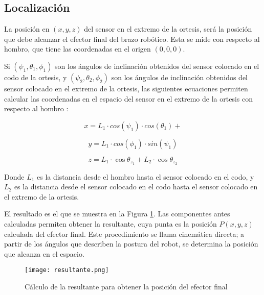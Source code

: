 \subsection{Localización}

La posición en $(x, y, z)$ del sensor en el extremo de la ortesis, será la posición que debe alcanzar el efector final del brazo robótico. Esta se mide con respecto al hombro, que tiene las coordenadas en el origen $(0, 0 ,0)$.

Si $(\psi_{1}, \theta_{1}, \phi_{1})$ son los ángulos de inclinación obtenidos del sensor colocado en el codo de la ortesis, y $(\psi_{2}, \theta_{2}, \phi_{2})$ son los ángulos de inclinación obtenidos del sensor colocado en el extremo de la ortesis, las siguientes ecuaciones permiten calcular las coordenadas en el espacio del sensor en el extremo de la ortesis con respecto al hombro \cite{mathworks2025}:

\begin{equation}
	x = L_1 \cdot cos(\psi_{1}) \cdot cos(\theta_{1}) +  
	\label{eq:angulox}
\end{equation}

\begin{equation}
	y = L_1 \cdot cos(\phi_{1}) \cdot sin(\psi_{1})
	\label{eq:angulox}
\end{equation}

\begin{equation}
	z = L_1 \cdot \cos \theta_{z_1} +  L_2 \cdot \cos \theta_{z_2}
	\label{eq:angulox}
\end{equation}

Donde $L_1$ es la distancia desde el hombro hasta el sensor colocado en el codo, y $L_2$ es la distancia desde el sensor colocado en el codo hasta el sensor colocado en el extremo de la ortesis.

El resultado es el que se muestra en la Figura \ref{fig:resultante}. Las componentes antes calculadas permiten obtener la resultante, cuya punta es la posición $P(x,y,z)$ calculada del efector final. Este procedimiento se llama cinemática directa; a partir de los ángulos que describen la postura del robot, se determina la posición que alcanza en el espacio.

\begin{figure}[htb]
	\centering
	\texttt{[image: resultante.png]}
	\caption{Cálculo de la resultante para obtener la posición del efector final}
	\label{fig:resultante}
\end{figure}